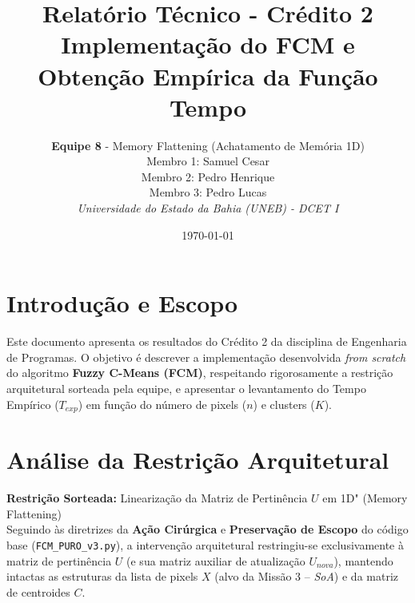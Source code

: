 \documentclass[11pt,a4paper]{article}
\title{\textbf{Relatório Técnico - Crédito 2}\\ \Large{Implementação do FCM e Obtenção Empírica da Função Tempo}}
\author{
    \textbf{Equipe 8} - Memory Flattening (Achatamento de Memória 1D) \\
    Membro 1: Samuel Cesar \\
    Membro 2: Pedro Henrique \\
    Membro 3: Pedro Lucas \\
    \textit{Universidade do Estado da Bahia (UNEB) - DCET I}
}
\date{\today}
\begin{document}
\maketitle

\section{Introdução e Escopo}
Este documento apresenta os resultados do Crédito 2 da disciplina de Engenharia de Programas. O objetivo é descrever a implementação desenvolvida \textit{from scratch} do algoritmo \textbf{Fuzzy C-Means (FCM)}, respeitando rigorosamente a restrição arquitetural sorteada pela equipe, e apresentar o levantamento do Tempo Empírico ($T_{exp}$) em função do número de pixels ($n$) e clusters ($K$).

\section{Análise da Restrição Arquitetural}

\textbf{Restrição Sorteada:} Linearização da Matriz de Pertinência $U$ em 1D" (Memory Flattening) \\

Seguindo às diretrizes da \textbf{Ação Cirúrgica} e \textbf{Preservação de Escopo} do código base (\texttt{FCM\_PURO\_v3.py}), a intervenção arquitetural restringiu-se exclusivamente à matriz de pertinência $U$ (e sua matriz auxiliar de atualização $U_{nova}$), mantendo intactas as estruturas da lista de pixels $X$ (alvo da Missão 3 -- \textit{SoA}) e da matriz de centroides $C$.
\end{document}
